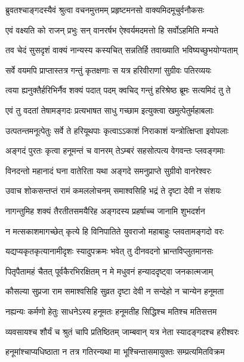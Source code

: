\twolineshloka
{ब्रुवतश्चाङ्गदस्यैवं श्रुत्वा वचनमुत्तमम्}
{प्रहृष्टमनसो वाक्यमिदमूचुर्वनौकसः} %

\twolineshloka
{एवं वक्ष्यति को राजन् प्रभुः सन् वानरर्षभ}
{ऐश्वर्यमदमत्तो हि सर्वोऽहमिति मन्यते} %

\twolineshloka
{तव चेदं सुसदृशं वाक्यं नान्यस्य कस्यचित्}
{सन्नतिर्हि तवाख्याति भविष्यच्छुभयोग्यताम्} %

\twolineshloka
{सर्वे वयमपि प्राप्तास्तत्र गन्तुं कृतक्षणाः}
{स यत्र हरिवीराणां सुग्रीवः पतिरव्ययः} %

\twolineshloka
{त्वया ह्यनुक्तैर्हरिभिर्नैव शक्यं पदात् पदम्}
{क्वचिद् गन्तुं हरिश्रेष्ठ ब्रूमः सत्यमिदं तु ते} %

\twolineshloka
{एवं तु वदतां तेषामङ्गदः प्रत्यभाषत}
{साधु गच्छाम इत्युक्त्वा खमुत्पेतुर्महाबलाः} %

\twolineshloka
{उत्पतन्तमनूत्पेतुः सर्वे ते हरियूथपाः}
{कृत्वाऽऽकाशं निराकाशं यन्त्रोत्क्षिप्ता इवोपलाः} %

\twolineshloka
{अङ्गदं पुरतः कृत्वा हनूमन्तं च वानरम्}
{तेऽम्बरं सहसोत्पत्य वेगवन्तः प्लवङ्गमाः} %

\twolineshloka
{विनदन्तो महानादं घना वातेरिता यथा}
{अङ्गदे समनुप्राप्ते सुग्रीवो वानरेश्वरः} %

\twolineshloka
{उवाच शोकसन्तप्तं रामं कमललोचनम्}
{समाश्वसिहि भद्रं ते दृष्टा देवी न संशयः} %

\twolineshloka
{नागन्तुमिह शक्यं तैरतीतसमयैरिह}
{अङ्गदस्य प्रहर्षाच्च जानामि शुभदर्शन} %

\twolineshloka
{न मत्सकाशमागच्छेत् कृत्ये हि विनिपातिते}
{युवराजो महाबाहुः प्लवतामङ्गदो वरः} %

\twolineshloka
{यद्यप्यकृतकृत्यानामीदृशः स्यादुपक्रमः}
{भवेत् तु दीनवदनो भ्रान्तविप्लुतमानसः} %

\twolineshloka
{पितृपैतामहं चैतत् पूर्वकैरभिरक्षितम्}
{न मे मधुवनं हन्याददृष्ट्वा जनकात्मजाम्} %

\twolineshloka
{कौसल्या सुप्रजा राम समाश्वसिहि सुव्रत}
{दृष्टा देवी न सन्देहो न चान्येन हनूमता} %

\twolineshloka
{नह्यन्यः कर्मणो हेतुः साधनेऽस्य हनूमतः}
{हनूमतीह सिद्धिश्च मतिश्च मतिसत्तम} %

\twolineshloka
{व्यवसायश्च शौर्यं च श्रुतं चापि प्रतिष्ठितम्}
{जाम्बवान् यत्र नेता स्यादङ्गदश्च हरीश्वरः} %

\twolineshloka
{हनूमांश्चाप्यधिष्ठाता न तत्र गतिरन्यथा}
{मा भूश्चिन्तासमायुक्तः सम्प्रत्यमितविक्रम} %

